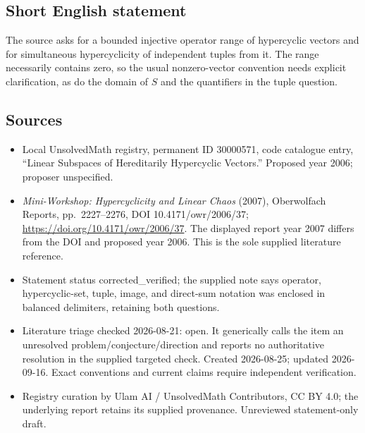 \documentclass[11pt]{article}
\begin{document}
\subsection{Short English statement}
The source asks for a bounded injective operator range of hypercyclic vectors and for simultaneous hypercyclicity of independent tuples from it. The range necessarily contains zero, so the usual nonzero-vector convention needs explicit clarification, as do the domain of $S$ and the quantifiers in the tuple question.
\subsection{Sources}
\begin{itemize}
\item Local UnsolvedMath registry, permanent ID 30000571, code catalogue entry, ``Linear Subspaces of Hereditarily Hypercyclic Vectors.'' Proposed year 2006; proposer unspecified.
\item \emph{Mini-Workshop: Hypercyclicity and Linear Chaos} (2007), Oberwolfach Reports, pp.\ 2227--2276, DOI 10.4171/owr/2006/37; \url{https://doi.org/10.4171/owr/2006/37}. The displayed report year 2007 differs from the DOI and proposed year 2006. This is the sole supplied literature reference.
\item Statement status corrected\_verified; the supplied note says operator, hypercyclic-set, tuple, image, and direct-sum notation was enclosed in balanced delimiters, retaining both questions.
\item Literature triage checked 2026-08-21: open. It generically calls the item an unresolved problem/conjecture/direction and reports no authoritative resolution in the supplied targeted check. Created 2026-08-25; updated 2026-09-16. Exact conventions and current claims require independent verification.
\item Registry curation by Ulam AI / UnsolvedMath Contributors, CC BY 4.0; the underlying report retains its supplied provenance. Unreviewed statement-only draft.
\end{itemize}
\end{document}
